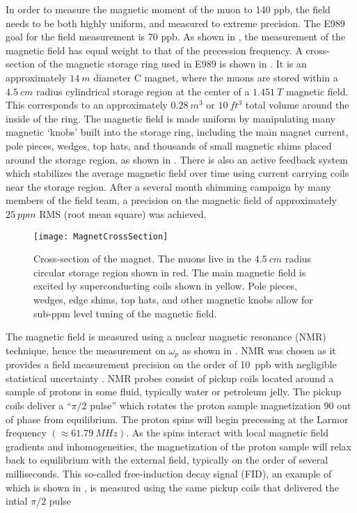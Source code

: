 In order to measure the magnetic moment of the muon to 140 ppb, the field needs to be both highly uniform, and measured to extreme precision. The E989 goal for the field measurement is 70 ppb. As shown in , the measurement of the magnetic field has equal weight to that of the precession frequency. A cross-section of the magnetic storage ring used in E989 is shown in . It is an approximately $\SI{14}{m}$ diameter C magnet, where the muons are stored within a $\SI{4.5}{cm}$ radius cylindrical storage region at the center of a $\SI{1.451}{T}$ magnetic field. This corresponds to an approximately $\SI{0.28}{m^{3}}$ or $\SI{10}{ft^{3}}$ total volume around the inside of the ring. The magnetic field is made uniform by manipulating many magnetic `knobs' built into the \gmtwo storage ring, including the main magnet current, pole pieces, wedges, top hats, and thousands of small magnetic shims placed around the storage region, as shown in . There is also an active feedback system which stabilizes the average magnetic field over time using current carrying coils near the storage region. After a several month shimming campaign by many members of the field team, a precision on the magnetic field of approximately $\SI{25}{ppm}$ RMS (root mean square) was achieved.

\begin{figure}[]
    \centering
    \texttt{[image: MagnetCrossSection]}
    \caption[Magnet cross section]{Cross-section of the \gmtwo magnet. The muons live in the $\SI{4.5}{cm}$ radius circular storage region shown in red. The main magnetic field is excited by superconducting coils shown in yellow. Pole pieces, wedges, edge shims, top hats, and other magnetic knobs allow for sub-ppm level tuning of the magnetic field.}
    \label{fig:MagnetCrossSection}
\end{figure}


The magnetic field is measured using a nuclear magnetic resonance (NMR) technique, hence the measurement on $\omega_{p}$ as shown in . NMR was chosen as it provides a field measurement precision on the order of \SI{10}{ppb} with negligible statistical uncertainty \cite{TDR}. NMR probes consist of pickup coils located around a sample of protons in some fluid, typically water or petroleum jelly. The pickup coils deliver a ``$\pi/2$ pulse'' which rotates the proton sample magnetization 90\textdegree{} out of phase from equilibrium. The proton spins will begin precessing at the Larmor frequency $(\approx \SI{61.79}{MHz})$. As the spins interact with local magnetic field gradients and inhomogeneities, the magnetization of the proton sample will relax back to equilibrium with the external field, typically on the order of several milliseconds. This so-called free-induction decay signal (FID), an example of which is shown in , is measured using the same pickup coils that delivered the intial $\pi/2$ pulse



